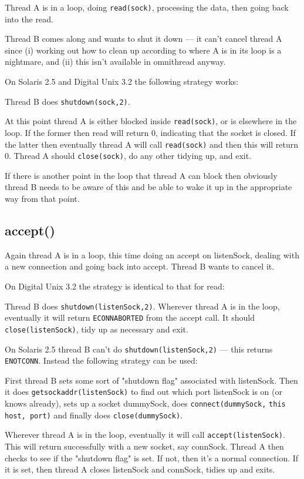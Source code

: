 \documentclass[11pt,twoside,a4paper]{article}
\begin{document}
Thread A is in a loop, doing \verb|read(sock)|, processing the data,
then going back into the read.

Thread B comes along and wants to shut it down --- it can't cancel
thread A since (i) working out how to clean up according to where A is
in its loop is a nightmare, and (ii) this isn't available in
omnithread anyway.

On Solaris 2.5 and Digital Unix 3.2 the following strategy works:

Thread B does \verb|shutdown(sock,2)|.

At this point thread A is either blocked inside \verb|read(sock)|, or
is elsewhere in the loop.  If the former then read will return 0,
indicating that the socket is closed.  If the latter then eventually
thread A will call \verb|read(sock)| and then this will return 0.
Thread A should \verb|close(sock)|, do any other tidying up, and exit.

If there is another point in the loop that thread A can block then
obviously thread B needs to be aware of this and be able to wake it up
in the appropriate way from that point.



\subsection{accept()}

Again thread A is in a loop, this time doing an accept on listenSock,
dealing with a new connection and going back into accept.  Thread B
wants to cancel it.

On Digital Unix 3.2 the strategy is identical to that for read:

Thread B does \verb|shutdown(listenSock,2)|.  Wherever thread A is in
the loop, eventually it will return \verb|ECONNABORTED| from the
accept call.  It should \verb|close(listenSock)|, tidy up as necessary
and exit.

On Solaris 2.5 thread B can't do \verb|shutdown(listenSock,2)| ---
this returns \verb|ENOTCONN|.  Instead the following strategy can be
used:

First thread B sets some sort of "shutdown flag" associated with
listenSock.  Then it does \verb|getsockaddr(listenSock)| to find out
which port listenSock is on (or knows already), sets up a socket
dummySock, does \verb|connect(dummySock,| \verb|this host, port)| and
finally does \verb|close(dummySock)|.

Wherever thread A is in the loop, eventually it will call
\verb|accept(listenSock)|.  This will return successfully with a new
socket, say connSock.  Thread A then checks to see if the "shutdown
flag" is set.  If not, then it's a normal connection.  If it is set,
then thread A closes listenSock and connSock, tidies up and exits.
\end{document}
